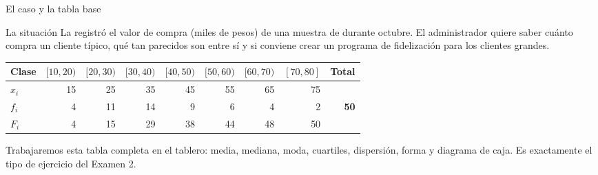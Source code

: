 \documentclass[aspectratio=169,10pt]{beamer}
\begin{document}
\begin{frame}{El caso y la tabla base}
  \scriptsize
  \begin{exampleblock}{La situación}
    \tiny
    La  registró el valor de compra (miles de
    pesos) de una muestra de  durante octubre. El
    administrador quiere saber cuánto compra un cliente típico, qué tan
    parecidos son entre sí y si conviene crear un programa de fidelización
    para los clientes grandes.
  \end{exampleblock}

  \vspace{0.1cm}
  \begin{center}
  \begin{tabular}{@{}lrrrrrrrr@{}}
    \toprule
    \textbf{Clase} & $[10,20)$ & $[20,30)$ & $[30,40)$ & $[40,50)$ &
    $[50,60)$ & $[60,70)$ & $[70,80]$ & \textbf{Total} \\
    \midrule
    $x_i$ & 15 & 25 & 35 & 45 & 55 & 65 & 75 & \\
    $f_i$ &  4 & 11 & 14 &  9 &  6 &  4 &  2 & \textbf{50} \\
    $F_i$ &  4 & 15 & 29 & 38 & 44 & 48 & 50 & \\
    \bottomrule
  \end{tabular}
  \end{center}

  \vspace{0.1cm}
  {\tiny\color{uniGris} Trabajaremos esta tabla completa en el tablero: media,
  mediana, moda, cuartiles, dispersión, forma y diagrama de caja. Es
  exactamente el tipo de ejercicio del Examen 2.}
\end{frame}
\end{document}
